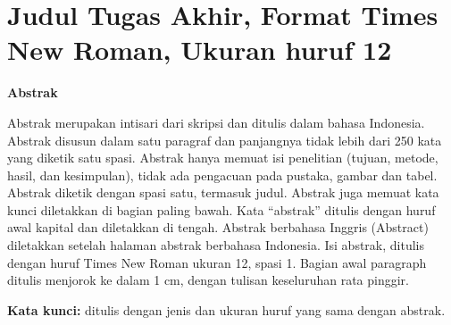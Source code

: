 \chapter*{\large Judul Tugas Akhir, Format Times New Roman, Ukuran huruf 12}
\begin{center}
    \textbf{Abstrak}
\end{center}
Abstrak merupakan intisari dari skripsi dan ditulis dalam bahasa Indonesia. Abstrak disusun dalam satu paragraf dan panjangnya tidak lebih dari 250 kata yang diketik satu spasi. Abstrak hanya memuat isi penelitian (tujuan, metode, hasil, dan kesimpulan), tidak ada pengacuan pada pustaka, gambar dan tabel. Abstrak diketik dengan spasi satu, termasuk judul. Abstrak juga memuat kata kunci diletakkan di bagian paling bawah. Kata “abstrak” ditulis dengan huruf awal kapital dan diletakkan di tengah. Abstrak berbahasa Inggris (Abstract) diletakkan setelah halaman abstrak berbahasa Indonesia. Isi abstrak, ditulis dengan huruf Times New Roman ukuran 12, spasi 1. Bagian awal paragraph ditulis menjorok ke dalam 1 cm, dengan tulisan keseluruhan rata pinggir.

\vspace{0.5cm}
\noindent \textbf{Kata kunci:} ditulis dengan jenis dan ukuran huruf yang sama dengan abstrak.
